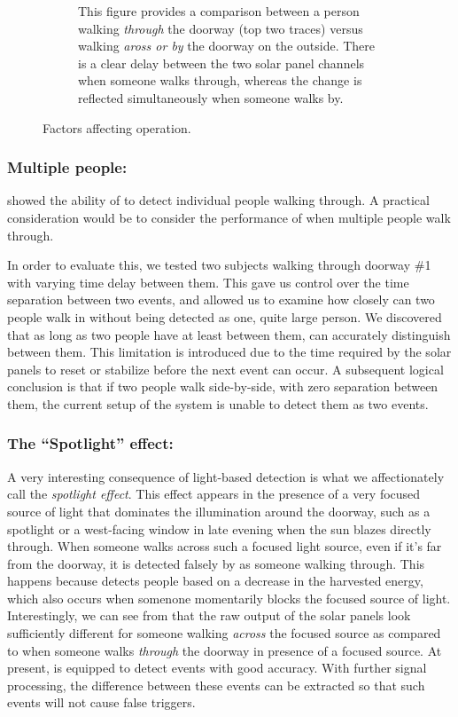 \begin{figure}[t]
\begin{subfigure}[b]{0.45\textwidth}
        \caption{ This figure provides a comparison between a person walking \textit{through} the doorway (top two traces) versus walking \textit{aross or by} the doorway on the outside. There is a clear delay between the two solar panel channels when someone walks through, whereas the change is reflected simultaneously when someone walks by.}
        \label{fig:across}
    \end{subfigure}
    \caption{Factors affecting \sysname operation. \label{fig:confounds}}
\end{figure}


\subsubsection{Multiple people:}
 showed the ability of \sysname to detect individual people walking through.
A practical consideration would be to consider the performance of \sysname when multiple people walk through.

In order to evaluate this, we tested two subjects walking through doorway \#1 with varying time delay between them.
This gave us control over the time separation between two events, and allowed us to examine how closely can two people walk in without being detected as one, quite large person.
We discovered that as long as two people have at least \minSeparation between them, \sysname can accurately distinguish between them.
This limitation is introduced due to the time required by the solar panels to reset or stabilize before the next event can occur.
A subsequent logical conclusion is that if two people walk side-by-side, \ie with zero separation between them, the current setup of the system is unable to detect them as two events.

\subsubsection{The ``Spotlight'' effect:}
A very interesting consequence of light-based detection is what we affectionately call the \textit{spotlight effect}.
This effect appears in the presence of a very focused source of light that dominates the illumination around the doorway, such as a spotlight or a west-facing window in late evening when the sun blazes directly through.
When someone walks across such a focused light source, even if it's far from the doorway, it is detected falsely by \sysname as someone walking through.
This happens because \sysname detects people based on a decrease in the harvested energy, which also occurs when somenone momentarily blocks the focused source of light.
Interestingly, we can see from  that the raw output of the solar panels look sufficiently different for someone walking \textit{across} the focused source as compared to when someone walks \textit{through} the doorway in presence of a focused source.
At present, \sysname is equipped to detect events with good accuracy.
With further signal processing, the difference between these events can be extracted so that such events will not cause false triggers.


